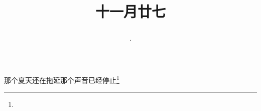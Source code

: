 \title{\date[d=27,m=12,y=2024][year:cn-y,年,month:cn,day:cn,日,·,weekday]·十一月廿七 }
那个夏天还在拖延那个声音已经停止\footnote{ }

